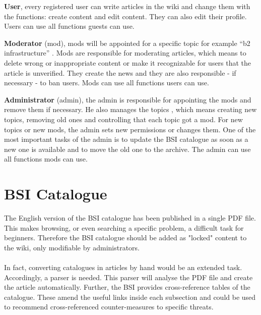 \textbf{User}, every registered user can write articles in the wiki and change them with the functions: create content and edit content. 
They can also edit their profile. 
Users can use all functions guests can use.

\textbf{Moderator} (mod), mods will be appointed for a specific topic for example “b2 infrastructure” . 
Mods are responsible for moderating articles, which means to delete wrong or inappropriate content or make it recognizable for users that the article is unverified. 
They create the news  and they are also responsible - if necessary - to ban users. 
Mods can use all functions users can use.

\textbf{Administrator} (admin), the admin is responsible for appointing the mods and remove them if necessary. 
He also manages the topics , which means creating new topics, removing old ones and controlling that each topic got a mod. 
For new topics or new mods, the admin sets new permissions or changes them. 
One of the most important tasks of the admin is to update the BSI catalogue as soon as a new one is available and to move the old one to the archive. 
The admin can use all functions mods can use.


\section{BSI Catalogue}
The English version of the BSI catalogue has been published in a single PDF file. 
This makes browsing, or even searching a specific problem, a difficult task for beginners. 
Therefore the BSI catalogue should be added as "locked" content to the wiki, only modifiable by administrators.
\\\\
In fact, converting catalogues in articles by hand would be an extended task. 
Accordingly, a parser is needed. 
This parser will analyse the PDF file and create the article automatically. 
Further, the BSI provides cross-reference tables of the catalogue. 
These amend the useful links inside each subsection and could be used to recommend cross-referenced counter-measures to specific threats.


